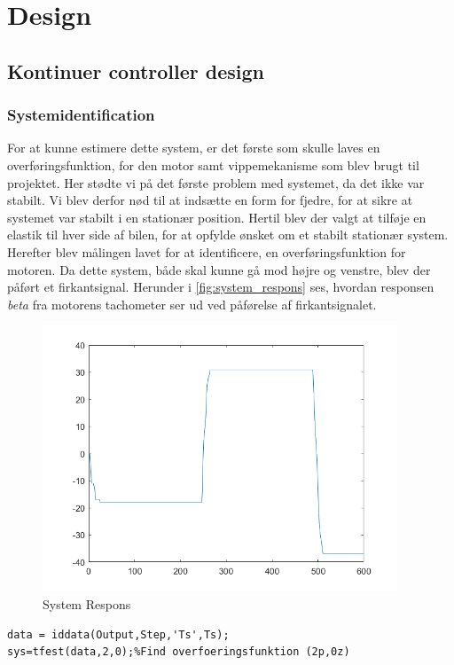 \section{Design}


\subsection{Kontinuer controller design}
\subsubsection{Systemidentification}

For at kunne estimere dette system, er det første som skulle laves en overføringsfunktion, for den motor samt vippemekanisme som blev brugt til projektet. Her stødte vi på det første problem med systemet, da det ikke var stabilt. Vi blev derfor nød til at indsætte en form for fjedre, for at sikre at systemet var stabilt i en stationær position. Hertil blev der valgt at tilføje en elastik til hver side af bilen, for at opfylde ønsket om et stabilt stationær system. 
Herefter blev målingen lavet for at identificere, en overføringsfunktion for motoren. Da dette system, både skal kunne gå mod højre og venstre, blev der påført et firkantsignal. Herunder i \autoref{fig:system_respons} ses, hvordan responsen \textit{beta} fra motorens tachometer ser ud ved påførelse af firkantsignalet.      


\begin{figure}[H]
	\centering
	\includegraphics[width = 300pt]{figur/system_respons}
	\caption{System Respons}
	\label{fig:system_respons}
\end{figure}

\begin{lstlisting}[frame=single]
data = iddata(Output,Step,'Ts',Ts);
sys=tfest(data,2,0);%Find overfoeringsfunktion (2p,0z)
\end{lstlisting}

